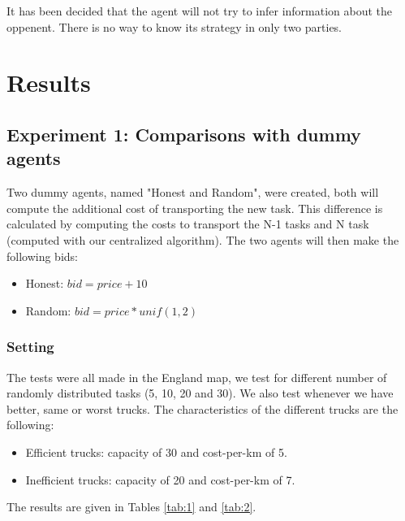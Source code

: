 \documentclass[11pt]{article}
\begin{document}
It has been decided that the agent will not try to infer information about the oppenent. There is no way to know its strategy in only two parties. 

\section{Results}

\subsection{Experiment 1: Comparisons with dummy agents}
Two dummy agents, named "Honest and Random", were created, both will compute the additional cost of transporting the new task. This difference is calculated by computing the costs to transport the N-1 tasks and N task (computed with our centralized algorithm). The two agents will then make the following bids:
\begin{itemize}
  \item Honest: $bid = price + 10$
  \item Random: $bid = price * unif(1,2)$
\end{itemize}

\subsubsection{Setting}
The tests were all made in the England map, we test for different number of randomly distributed tasks (5, 10, 20 and 30). We also test whenever we have better, same or worst trucks. 
The characteristics of the different trucks are the following:
\begin{itemize}
  \item Efficient trucks: capacity of 30 and cost-per-km of 5.
  \item Inefficient trucks: capacity of 20 and cost-per-km of 7.
\end{itemize}

The results are given in Tables \ref{tab:1} and \ref{tab:2}.
\end{document}
